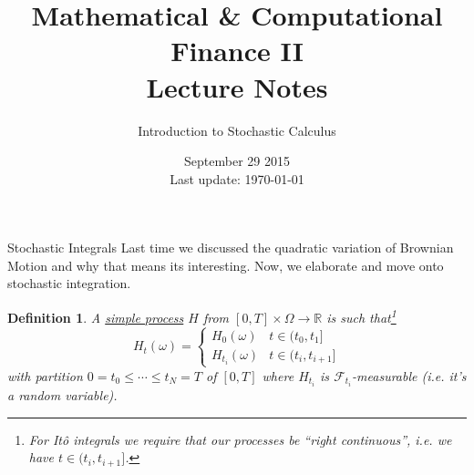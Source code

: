 \documentclass[12pt]{article}
\newtheorem{definition}{Definition}
\newlength\tindent
\renewcommand{\indent}{\hspace*{\tindent}}
\begin{document}
 
\title{Mathematical \& Computational Finance II\\Lecture Notes}
\author{Introduction to Stochastic Calculus}
\date{September 29 2015 \\ Last update: \today{}}
\maketitle

\begin{section}{Stochastic Integrals}
\indent Last time we discussed the quadratic variation of Brownian Motion and why that means its interesting. Now, we elaborate and move onto stochastic integration.

\begin{definition} A \underline{simple process} $H$ from $[0,T]\times\Omega \rightarrow \mathbb R$ is such that\footnote{For It\^{o} integrals we require that our processes be ``right continuous'', i.e. we have $t \in (t_i, t_{i + 1}]$.}
\begin{equation*}
	H_t(\omega) = 
		\begin{cases}
			H_0(\omega) & t \in (t_0, t_1] \\
			H_{t_i}(\omega) & t \in (t_i, t_{i+1}]
		\end{cases}
\end{equation*}
with partition $0 = t_0 \leq \cdots \leq t_N = T$ of $[0,T]$ where $H_{t_i}$ is $\mathcal F_{t_i}$-measurable (i.e. it's a random variable).

\begin{figure}[h!]
\centering
{}
\end{figure}
\end{definition}


\end{section}
\end{document}
